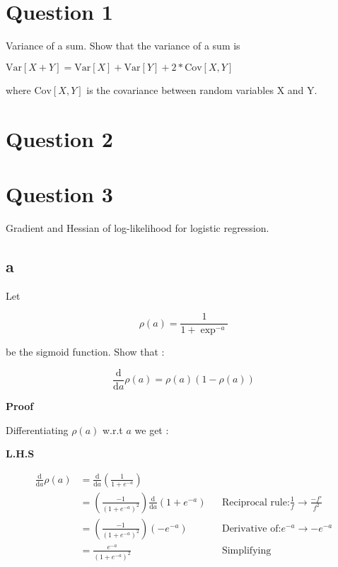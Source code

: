 \documentclass[12pt]{article}
\newcommand{\Var}{\mathrm{Var}}
\newcommand{\Cov}{\mathrm{Cov}}
\newcommand{\deriv}[2]{\frac{\mathrm{d}}{\mathrm{d} #1}{#2}}
\begin{document}
\maketitle
\pagebreak

\section{Question 1}
Variance of a sum. Show that the variance of a sum  is

$\Var[X + Y] = \Var[X] + \Var[Y ] + 2 * \Cov[X,Y]$

where $\Cov[X,Y ]$ is the covariance between random variables X and Y.


\section {Question 2}

\pagebreak
\section {Question 3}
Gradient and Hessian of log-likelihood for logistic regression.
\subsection{a} 
Let

\begin{equation}
    \rho(a) = \frac{1}{1+\exp^{-a}}
\end{equation}

be the sigmoid function. Show that :

\begin{equation}
    \deriv{a}{\rho(a)} = \rho(a)(1 − \rho(a))
\end{equation}


\textbf{Proof}

Differentiating $\rho(a)$ w.r.t $a$ we get :

\textbf{L.H.S}

    \begin{align*}
        \deriv{a}{\rho(a)}  &= \deriv{a}{\left( \frac{1}{1 + e^{-a}} \right) }\\
                            &= \left( \frac{-1}{(1 + e^{-a})^{2}} \right) \deriv{a}{\left( 1 + e^{-a} \right)} 
                            && \text{Reciprocal rule:}\frac{1}{f} \rightarrow \frac{-f\prime}{f^2} \\
                            &= \left( \frac{-1}{(1 + e^{-a})^2} \right) \left( -{e^{-a}} \right)
                            && \text{Derivative of:} e^{-a} \rightarrow -e^{-a} \\
                            &= \frac{e^{-a}}{(1 + e^{-a}) ^ 2} && \text {Simplifying} 
    \end{align*}
\end{document}
